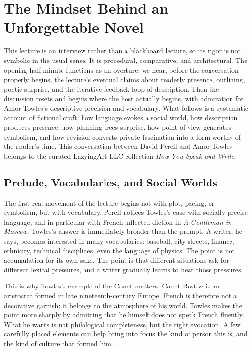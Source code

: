 \chapter{The Mindset Behind an Unforgettable Novel}

This lecture is an interview rather than a blackboard lecture, so its rigor is not symbolic in the usual sense. It is procedural, comparative, and architectural. The opening half-minute functions as an overture: we hear, before the conversation properly begins, the lecture's eventual claims about readerly presence, outlining, poetic surprise, and the iterative feedback loop of description. Then the discussion resets and begins where the host actually begins, with admiration for Amor Towles's descriptive precision and vocabulary. What follows is a systematic account of fictional craft: how language evokes a social world, how description produces presence, how planning frees surprise, how point of view generates symbolism, and how revision converts private fascination into a form worthy of the reader's time. This conversation between David Perell and Amor Towles belongs to the curated LazyingArt LLC collection \emph{How You Speak and Write}.

\section{Prelude, Vocabularies, and Social Worlds}

The first real movement of the lecture begins not with plot, pacing, or symbolism, but with vocabulary. Perell notices Towles's ease with socially precise language, and in particular with French-inflected diction in \emph{A Gentleman in Moscow}. Towles's answer is immediately broader than the prompt. A writer, he says, becomes interested in many vocabularies: baseball, city streets, finance, ethnicity, technical disciplines, even the language of physics. The point is not accumulation for its own sake. The point is that different situations ask for different lexical pressures, and a writer gradually learns to hear those pressures.

This is why Towles's example of the Count matters. Count Rostov is an aristocrat formed in late nineteenth-century Europe. French is therefore not a decorative garnish; it belongs to the atmosphere of his world. Towles makes the point more sharply by admitting that he himself does not speak French fluently. What he wants is not philological completeness, but the right evocation. A few carefully placed elements can help bring into focus the kind of person this is, and the kind of culture that formed him.

